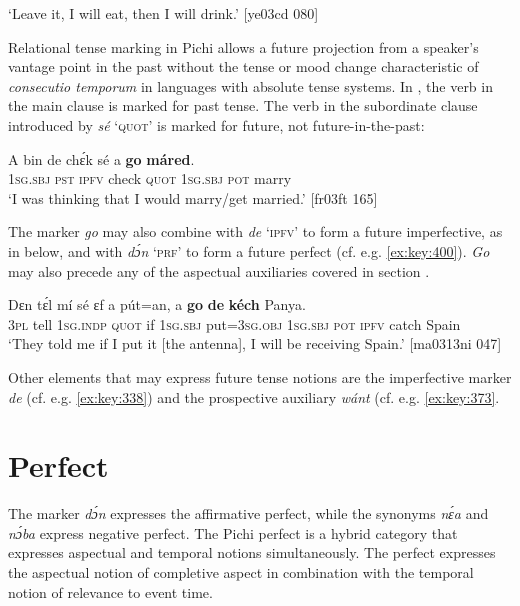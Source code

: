 \glt ‘Leave it, I will eat, then I will drink.’ [ye03cd 080]
\z

Relational tense marking in Pichi allows a future projection from a speaker’s vantage point in the past without the tense or mood change characteristic of \textit{consecutio temporum} in languages with absolute tense systems. In , the verb in the main clause is marked for past tense. The verb in the subordinate clause introduced by \textit{sé} ‘\textsc{quot}’ is marked for future, not future-in-the-past: 


\ea%
    \label{ex:key:390}
    \gll A    bin  de    chɛ́k  sé    a    \textbf{go}  \textbf{máred}.\\
\textsc{1sg.sbj}  \textsc{pst}  \textsc{ipfv}    check  \textsc{quot}    \textsc{1sg.sbj}  \textsc{pot}  marry\\

\glt ‘I was thinking that I would marry/get married.’ [fr03ft 165]
\z

The marker \textit{go} may also combine with \textit{de} ‘\textsc{ipfv’} to form a future imperfective, {{as in  below,}} and with \textit{dɔ́n} ‘\textsc{prf}’ to form a future perfect (cf. e.g. \ref{ex:key:400}). \textit{Go} may also precede any of the aspectual auxiliaries covered in section .


\ea%
    \label{ex:key:391}
    \gll Dɛn  tɛ́l  mí    sé    ɛf  a    pút=an,
a    \textbf{go}  \textbf{de}  \textbf{kéch}  Panya.\\
\textsc{3pl}  tell  \textsc{1sg.indp}  \textsc{quot}    if  \textsc{1sg.sbj}  put=\textsc{3sg.obj}
\textsc{1sg.sbj}  \textsc{pot}  \textsc{ipfv}  catch  Spain\\

\glt ‘They told me if I put it [the antenna], I will be receiving Spain.’ [ma0313ni 047]
\z

Other elements that may express future tense notions are the imperfective marker \textit{de} (cf. e.g. \ref{ex:key:338}) and the prospective auxiliary \textit{wánt} (cf. e.g. \ref{ex:key:373}.

\section{Perfect}\label{sec:6.6}

The marker \textit{dɔ́n} expresses the affirmative perfect, while the synonyms \textit{nɛ́a} and \textit{nɔ́ba} express negative perfect. The Pichi perfect is a hybrid category that expresses aspectual and temporal notions simultaneously. The perfect expresses the aspectual notion of completive aspect{\fff} in combination with the temporal notion of relevance to event time. 


